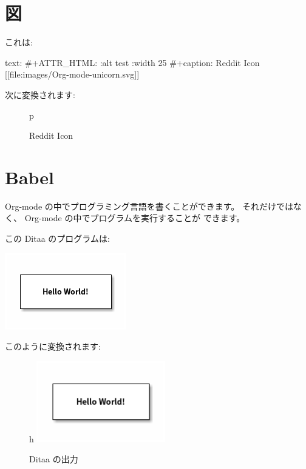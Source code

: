 \documentclass[dvipdfmx,a4j,14pt,uplatex,openany]{jsbook}
\begin{document}
\section{図}
\label{sec:org1d626ef}
これは:

\begin{programlist}[label={nil}]{text}{: }#+ATTR_HTML: :alt test :width 25%
#+caption: Reddit Icon
[[file:images/Org-mode-unicorn.svg]]
\end{programlist}

次に変換されます:

\begin{figure}{p}
\centering

\caption{Reddit Icon}
\end{figure}


\newpage

\section{Babel}
\label{sec:orge96a5d2}
Org-mode の中でプログラミング言語を書くことができます。
それだけではなく、 Org-mode の中でプログラムを実行することが
できます。

この Ditaa のプログラムは:

\begin{center}
\includegraphics[width=.7\linewidth]{hello-world.png}
\end{center}

このように変換されます:

\begin{figure}{h}
\centering
\includegraphics[width=0.5\textwidth]{hello-world.png}
\caption{\label{fig:first}Ditaa の出力}
\end{figure}
\end{document}
